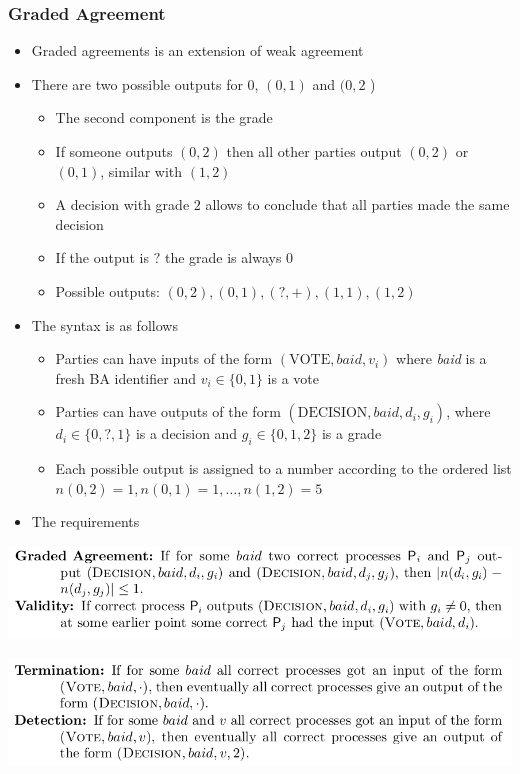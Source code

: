 \documentclass[11pt]{article}
\begin{document}
\subsubsection{Graded Agreement}
\label{sec:orgbb992bf}
\begin{itemize}
\item Graded agreements is an extension of weak agreement
\item There are two possible outputs for \(0\), \((0,1)\)  and \((0,2\) )
\begin{itemize}
\item The second component is the grade
\item If someone outputs \((0,2)\) then all other parties output \((0,2)\) or \((0,1)\), similar with \((1,2)\)
\item A decision with grade \(2\) allows to conclude that all parties made the same decision
\item If the output is \(?\) the grade is always \(0\)
\item Possible outputs: \((0,2),(0,1), (?,+), (1,1), (1,2)\)
\end{itemize}

\item The syntax is as follows
\begin{itemize}
\item Parties can have inputs of the form \((\text{VOTE}, baid, v_i)\) where \emph{baid} is a fresh BA identifier and \(v_i \in \{0,1\}\) is a vote
\item Parties can have outputs of the form \((\text{DECISION}, baid, d_i, g_i)\), where \(d_i \in \{0,?,1\}\) is a decision and \(g_i \in \{0,1,2\}\) is a grade
\item Each possible output is assigned to a number according to the ordered list \(n(0,2) = 1, n(0,1) = 1, \dots, n(1,2) =5\)
\end{itemize}

\item The requirements
\end{itemize}
\begin{center}
\includegraphics[width=.9\linewidth]{Asynchronous Agreement (8)/screenshot_2018-09-29_18-14-58.png}
\end{center}
\begin{center}
\includegraphics[width=.9\linewidth]{Asynchronous Agreement (8)/screenshot_2018-09-29_18-15-21.png}
\end{center}
\end{document}
